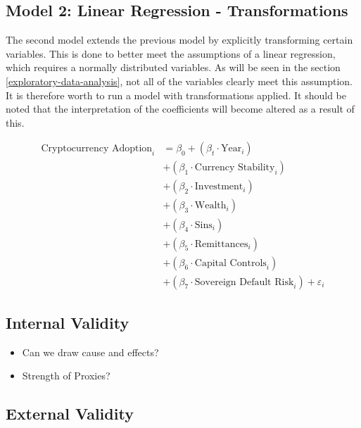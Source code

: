 \documentclass[
]{article}
\begin{document}
\subsection{Model 2: Linear Regression - Transformations}\label{model-2-linear-regression---transformations}

The second model extends the previous model by explicitly transforming certain variables. This is done to better meet the assumptions of a linear regression, which requires a normally distributed variables. As will be seen in the section \ref{exploratory-data-analysis}, not all of the variables clearly meet this assumption. It is therefore worth to run a model with transformations applied. It should be noted that the interpretation of the coefficients will become altered as a result of this.

\begin{align*}  
\text{Cryptocurrency Adoption}_{i} &= \beta_0 + (\beta_t \cdot \text{Year}_{i}) \\  
&+ (\beta_1 \cdot \text{Currency Stability}_{i}) \\
&+ (\beta_2 \cdot \text{Investment}_{i}) \\
&+ (\beta_3 \cdot \text{Wealth}_{i}) \\
&+ (\beta_4 \cdot \text{Sins}_{i}) \\
&+ (\beta_5 \cdot \text{Remittances}_{i}) \\
&+ (\beta_6 \cdot \text{Capital Controls}_{i}) \\
&+ (\beta_7 \cdot \text{Sovereign Default Risk}_{i}) + \varepsilon_{i}  \end{align*}

\subsection{Internal Validity}\label{internal-validity}

\begin{itemize}
\item
  Can we draw cause and effects?
\item
  Strength of Proxies?
\end{itemize}

\subsection{External Validity}\label{external-validity}
\end{document}
